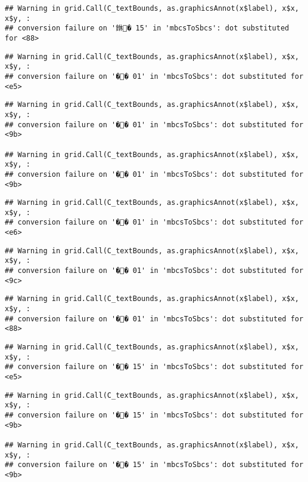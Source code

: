 \documentclass[]{article}
\begin{document}
\begin{verbatim}
## Warning in grid.Call(C_textBounds, as.graphicsAnnot(x$label), x$x, x$y, :
## conversion failure on '銝� 15' in 'mbcsToSbcs': dot substituted for <88>
\end{verbatim}

\begin{verbatim}
## Warning in grid.Call(C_textBounds, as.graphicsAnnot(x$label), x$x, x$y, :
## conversion failure on '�� 01' in 'mbcsToSbcs': dot substituted for <e5>
\end{verbatim}

\begin{verbatim}
## Warning in grid.Call(C_textBounds, as.graphicsAnnot(x$label), x$x, x$y, :
## conversion failure on '�� 01' in 'mbcsToSbcs': dot substituted for <9b>

## Warning in grid.Call(C_textBounds, as.graphicsAnnot(x$label), x$x, x$y, :
## conversion failure on '�� 01' in 'mbcsToSbcs': dot substituted for <9b>
\end{verbatim}

\begin{verbatim}
## Warning in grid.Call(C_textBounds, as.graphicsAnnot(x$label), x$x, x$y, :
## conversion failure on '�� 01' in 'mbcsToSbcs': dot substituted for <e6>
\end{verbatim}

\begin{verbatim}
## Warning in grid.Call(C_textBounds, as.graphicsAnnot(x$label), x$x, x$y, :
## conversion failure on '�� 01' in 'mbcsToSbcs': dot substituted for <9c>
\end{verbatim}

\begin{verbatim}
## Warning in grid.Call(C_textBounds, as.graphicsAnnot(x$label), x$x, x$y, :
## conversion failure on '�� 01' in 'mbcsToSbcs': dot substituted for <88>
\end{verbatim}

\begin{verbatim}
## Warning in grid.Call(C_textBounds, as.graphicsAnnot(x$label), x$x, x$y, :
## conversion failure on '�� 15' in 'mbcsToSbcs': dot substituted for <e5>
\end{verbatim}

\begin{verbatim}
## Warning in grid.Call(C_textBounds, as.graphicsAnnot(x$label), x$x, x$y, :
## conversion failure on '�� 15' in 'mbcsToSbcs': dot substituted for <9b>

## Warning in grid.Call(C_textBounds, as.graphicsAnnot(x$label), x$x, x$y, :
## conversion failure on '�� 15' in 'mbcsToSbcs': dot substituted for <9b>
\end{verbatim}
\end{document}
